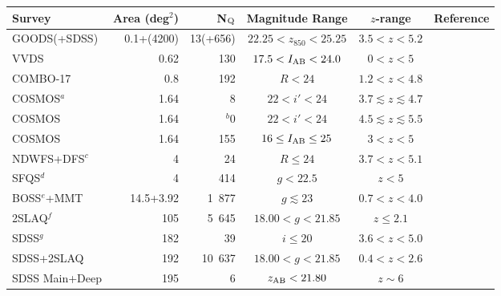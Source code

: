 \documentclass[11pt,a4paper]{article}
\begin{document}
\begin{landscape}
\begin{table*}
  \begin{center}
   \begin{tabular}{lrrccl}
      \hline
      \hline
      Survey                      & Area (deg$^{2}$) & N$_{\rm Q}$ & Magnitude Range & $z$-range & Reference  \\
      \hline 
      GOODS(+SDSS)        &   0.1+(4200)  &   13(+656)    &  $22.25 < z_{850} < 25.25$  & $3.5<z<5.2$  & \citet{Fontanot07} \\
      VVDS                       &        0.62    & 130      &  $17.5 < I_{\rm AB} < 24.0$ &  $0<z<5$    &  \citet{Bongiorno07} \\
      COMBO-17              &       0.8     & \hbox{  192} & $R<24$                       &  $1.2 < z < 4.8$  & \citet{Wolf03} \\
      COSMOS$^{a}$         &       1.64   & 8     & $22 < i' < 24$              & $3.7 \lesssim z \lesssim 4.7$   & \citet{Ikeda11} \\      
      COSMOS                  &       1.64    & $^{b}$0         & $22 < i' < 24$     & $4.5 \lesssim z \lesssim 5.5$   & \citet{Ikeda12} \\   
      COSMOS                  &       1.64    & 155              & $16 \leq  I_{\rm AB} \leq 25$      & $3<z<5$   & \citet{Masters12} \\   
      NDWFS+DFS$^{c}$   &       4        &                24  & $R \leq 24$                    & $3.7<z<5.1$       & \citet{Glikman11} \\
      SFQS$^{d}$               &       4        & \hbox{  414} & $g<22.5$                          & $z<5$                 & \citet{Jiang06} \\
      BOSS$^{e}$+MMT     & 14.5+3.92 & \hbox{1 877} & $g\lesssim 23$  & $0.7<z<4.0$ & \citet{Palanque-Delabrouille12} \\ 
      2SLAQ$^{f}$            &     105     & \hbox{ 5 645} & $18.00 < g < 21.85$         & $z\leq2.1$               & \citet{Richards05}     \\
      SDSS$^{g}$               &    182     &                  39  &  $i\leq 20$                        &  $3.6<z<5.0$    & \citet{Fan01b} \\
      SDSS+2SLAQ           &    192     & \hbox{10 637} & $18.00 < g < 21.85$        & $0.4<z<2.6 $    & \citet{Croom09b}     \\
      SDSS Main+Deep     &    195     &                     6 & $z_{\rm AB} < 21.80$        & $z\sim6 $         & \citet{Jiang09}     \\

\end{tabular}
\end{center}
\end{table*}
\end{landscape}
\end{document}
